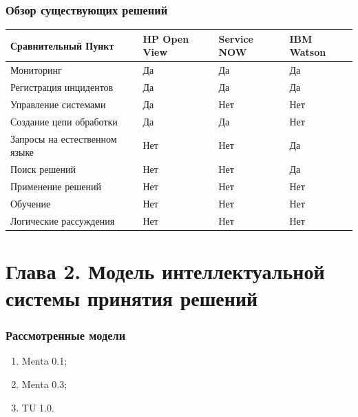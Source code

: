 \documentclass[14pt]{beamer}
\begin{document}
\begin{frame}
\frametitle{Обзор существующих решений}
\begin{table}
	
\small
\begin{tabular} {|p{5cm}|p{1cm}|p{1.5cm}|p{1.5cm}|}

\hline
\textbf{Сравнительный Пункт} & HP Open View & Service NOW & IBM Watson\\
\hline
   Мониторинг & Да & Да & Да  \\
   \hline
   Регистрация инцидентов & Да & Да & Да \\
   \hline
   Управление системами & Да & Нет & Нет  \\
   \hline 
   Создание цепи обработки & Да & Да & Нет \\
   \hline 
   Запросы на естественном языке & Нет & Нет & Да \\
   \hline 
   Поиск решений & Нет & Нет & Да \\
   \hline 
   Применение решений & Нет & Нет & Нет  \\
   \hline
   Обучение & Нет & Нет & Нет \\
   \hline
   Логические рассуждения & Нет & Нет & Нет  \\
   \hline
  
\end{tabular}
\end{table}
\end{frame}


%
%
\section[Глава 2]{Глава 2. Модель интеллектуальной системы принятия решений}
\begin{frame}
\frametitle{Рассмотренные модели}
\begin{enumerate}
	\item Menta 0.1;
	\item Menta 0.3;
	\item TU 1.0.
\end{enumerate}
\end{frame}
\end{document}
